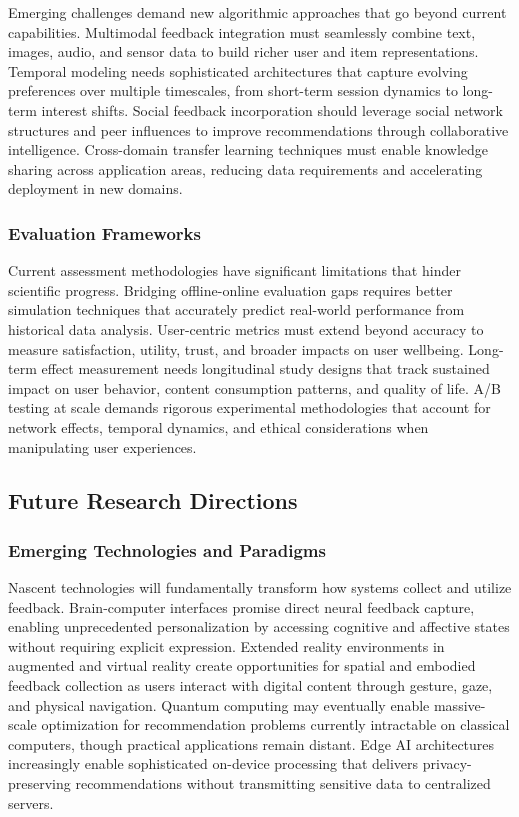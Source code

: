 Emerging challenges demand new algorithmic approaches that go beyond current capabilities. Multimodal feedback integration must seamlessly combine text, images, audio, and sensor data to build richer user and item representations. Temporal modeling needs sophisticated architectures that capture evolving preferences over multiple timescales, from short-term session dynamics to long-term interest shifts. Social feedback incorporation should leverage social network structures and peer influences to improve recommendations through collaborative intelligence. Cross-domain transfer learning techniques must enable knowledge sharing across application areas, reducing data requirements and accelerating deployment in new domains.

\subsubsection{Evaluation Frameworks}

Current assessment methodologies have significant limitations that hinder scientific progress. Bridging offline-online evaluation gaps requires better simulation techniques that accurately predict real-world performance from historical data analysis. User-centric metrics must extend beyond accuracy to measure satisfaction, utility, trust, and broader impacts on user wellbeing. Long-term effect measurement needs longitudinal study designs that track sustained impact on user behavior, content consumption patterns, and quality of life. A/B testing at scale demands rigorous experimental methodologies that account for network effects, temporal dynamics, and ethical considerations when manipulating user experiences.

\subsection{Future Research Directions}

\subsubsection{Emerging Technologies and Paradigms}

Nascent technologies will fundamentally transform how systems collect and utilize feedback. Brain-computer interfaces promise direct neural feedback capture, enabling unprecedented personalization by accessing cognitive and affective states without requiring explicit expression. Extended reality environments in augmented and virtual reality create opportunities for spatial and embodied feedback collection as users interact with digital content through gesture, gaze, and physical navigation. Quantum computing may eventually enable massive-scale optimization for recommendation problems currently intractable on classical computers, though practical applications remain distant. Edge AI architectures increasingly enable sophisticated on-device processing that delivers privacy-preserving recommendations without transmitting sensitive data to centralized servers.

